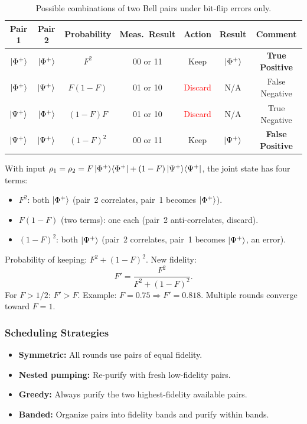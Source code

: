 \documentclass[10pt,a4paper]{article}
\begin{document}
\begin{table}[H]
\centering
\caption{Possible combinations of two Bell pairs under bit-flip errors only.}
\begin{tabular}{ccccccc}
\toprule
\textbf{Pair 1} & \textbf{Pair 2} & \textbf{Probability} & \textbf{Meas.\ Result} & \textbf{Action} & \textbf{Result} & \textbf{Comment} \\
\midrule
$\ket{\Phi^+}$ & $\ket{\Phi^+}$ & $F^2$        & 00 or 11 & Keep                          & $\ket{\Phi^+}$ & \textbf{True Positive}  \\
$\ket{\Phi^+}$ & $\ket{\Psi^+}$ & $F(1-F)$     & 01 or 10 & \textcolor{red}{Discard}      & N/A            & False Negative          \\
$\ket{\Psi^+}$ & $\ket{\Phi^+}$ & $(1-F)F$     & 01 or 10 & \textcolor{red}{Discard}      & N/A            & True Negative           \\
$\ket{\Psi^+}$ & $\ket{\Psi^+}$ & $(1-F)^2$    & 00 or 11 & Keep                          & $\ket{\Psi^+}$ & \textbf{False Positive} \\
\bottomrule
\end{tabular}
\end{table}

With input $\rho_1=\rho_2=F\ket{\Phi^+}\!\bra{\Phi^+}+(1-F)\ket{\Psi^+}\!\bra{\Psi^+}$, the joint state has four terms:
\begin{itemize}[nosep]
\item $F^2$: both $\ket{\Phi^+}$ (pair~2 correlates, pair~1 becomes $\ket{\Phi^+}$).
\item $F(1-F)$ (two terms): one each (pair~2 anti-correlates, discard).
\item $(1-F)^2$: both $\ket{\Psi^+}$ (pair~2 correlates, pair~1 becomes $\ket{\Psi^+}$, an error).
\end{itemize}
Probability of keeping: $F^2+(1-F)^2$. New fidelity:
\[
F'=\frac{F^2}{F^2+(1-F)^2}.
\]
For $F>1/2$: $F'>F$. Example: $F=0.75\Rightarrow F'=0.818$. Multiple rounds converge toward $F=1$.

\subsubsection*{Scheduling Strategies}

\begin{tcolorbox}[propstyle, title={Properties}]
\begin{itemize}[nosep]
\item \textbf{Symmetric:} All rounds use pairs of equal fidelity.
\item \textbf{Nested pumping:} Re-purify with fresh low-fidelity pairs.
\item \textbf{Greedy:} Always purify the two highest-fidelity available pairs.
\item \textbf{Banded:} Organize pairs into fidelity bands and purify within bands.
\end{itemize}
\end{tcolorbox}
\end{document}
